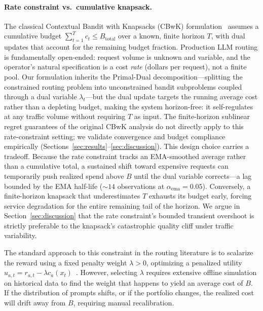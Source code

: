 \paragraph{Rate constraint vs.\ cumulative knapsack.}
The classical Contextual Bandit with Knapsacks (CBwK) formulation~\cite{agrawal2014bandits} assumes a cumulative budget $\sum_{t=1}^T c_t \leq B_{\mathrm{total}}$ over a known, finite horizon $T$, with dual updates that account for the remaining budget fraction.
Production LLM routing is fundamentally open-ended: request volume is unknown and variable, and the operator's natural specification is a cost \emph{rate} (dollars per request), not a finite pool.
Our formulation inherits the Primal-Dual decomposition---splitting the constrained routing problem into unconstrained bandit subproblems coupled through a dual variable $\lambda_t$---but the dual update targets the running average cost rather than a depleting budget, making the system horizon-free: it self-regulates at any traffic volume without requiring $T$ as input.
The finite-horizon sublinear regret guarantees of the original CBwK analysis do not directly apply to this rate-constraint setting; we validate convergence and budget compliance empirically (Sections~\ref{sec:results}--\ref{sec:discussion}).
This design choice carries a tradeoff.
Because the rate constraint tracks an EMA-smoothed average rather than a cumulative total, a sustained shift toward expensive requests can temporarily push realized spend above $B$ until the dual variable corrects---a lag bounded by the EMA half-life (${\sim}14$ observations at $\alpha_{\mathrm{ema}}{=}0.05$).
Conversely, a finite-horizon knapsack that underestimates $T$ exhausts its budget early, forcing service degradation for the entire remaining tail of the horizon.
We argue in Section~\ref{sec:discussion} that the rate constraint's bounded transient overshoot is strictly preferable to the knapsack's catastrophic quality cliff under traffic variability.

The standard approach to this constraint in the routing literature is to scalarize the reward using a fixed penalty weight $\lambda > 0$, optimizing a penalized utility $u_{a,t} = r_{a,t} - \lambda c_a(x_t)$~\cite{ong2024routellm}. However, selecting $\lambda$ requires extensive offline simulation on historical data to find the weight that happens to yield an average cost of $B$. If the distribution of prompts shifts, or if the portfolio changes, the realized cost will drift away from $B$, requiring manual recalibration.

